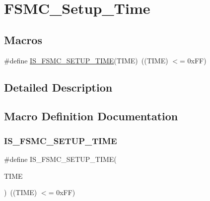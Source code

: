 \hypertarget{group___f_s_m_c___setup___time}{}\section{F\+S\+M\+C\+\_\+\+Setup\+\_\+\+Time}
\label{group___f_s_m_c___setup___time}
\subsection*{Macros}
\begin{DoxyCompactItemize}
\item 
\#define \mbox{\hyperlink{group___f_s_m_c___setup___time_ga4f2fbb8f6ec492cc241a49c468e0d98d}{I\+S\+\_\+\+F\+S\+M\+C\+\_\+\+S\+E\+T\+U\+P\+\_\+\+T\+I\+ME}}(T\+I\+ME)~((T\+I\+ME) $<$= 0x\+F\+F)
\end{DoxyCompactItemize}


\subsection{Detailed Description}


\subsection{Macro Definition Documentation}
\mbox{\label{group___f_s_m_c___setup___time_ga4f2fbb8f6ec492cc241a49c468e0d98d}} 
\subsubsection{\texorpdfstring{IS\_FSMC\_SETUP\_TIME}{IS\_FSMC\_SETUP\_TIME}}
{\footnotesize\ttfamily \#define I\+S\+\_\+\+F\+S\+M\+C\+\_\+\+S\+E\+T\+U\+P\+\_\+\+T\+I\+ME(\begin{DoxyParamCaption}\item[{}]{T\+I\+ME }\end{DoxyParamCaption})~((T\+I\+ME) $<$= 0x\+F\+F)}


